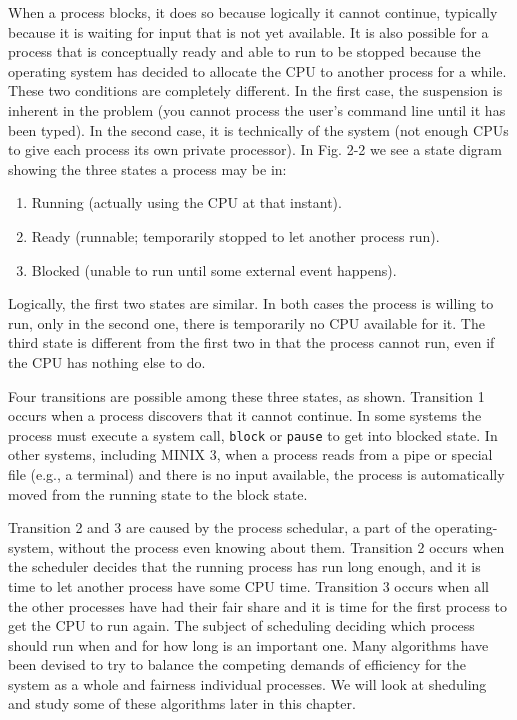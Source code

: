 \documentclass{book}
\newcommand {\cmd} [1] {\texttt{#1}}
\begin{document}
When a process blocks, it does so because logically it cannot continue, 
typically because it is waiting for input that is not yet available.
It is also possible for a process that is conceptually ready and able to run to be stopped 
because the operating system has decided to allocate the CPU to another process for a while.
These two conditions are completely different.
In the first case, the suspension is inherent in the problem 
(you cannot process the user's command line until it has been typed).
In the second case, it is technically of the system (not enough CPUs to give each process its own private processor).
In Fig. 2-2 we see a state digram showing the three states a process may be in:
\begin{enumerate}
  \item Running (actually using the CPU at that instant).
  \item Ready (runnable; temporarily stopped to let another process run).
  \item Blocked (unable to run until some external event happens).
\end{enumerate}

Logically, the first two states are similar.
In both cases the process is willing to run, only in the second one, there is temporarily no CPU available for it.
The third state is different from the first two in that the process cannot run, even if the CPU has nothing else to do.

Four transitions are possible among these three states, as shown.
Transition 1 occurs when a process discovers that it cannot continue.
In some systems the process must execute a system call, \cmd{block} or \cmd{pause} to get into blocked state.
In other systems, including MINIX 3, when a process reads from a pipe or special file (e.g., a terminal) and there is no input available,
the process is automatically moved from the running state to the block state.

Transition 2 and 3 are caused by the process schedular, a part of the operating-system,
without the process even knowing about them.
Transition 2 occurs when the scheduler decides that the running process has run long enough,
and it is time to let another process have some CPU time.
Transition 3 occurs when all the other processes have had their fair share 
and it is time for the first process to get the CPU to run again.
The subject of scheduling deciding which process should run when and for how long is an important one.
Many algorithms have been devised to try to 
balance the competing demands of efficiency for the system as a whole and fairness individual processes.
We will look at sheduling and study some of these algorithms later in this chapter.
\end{document}
